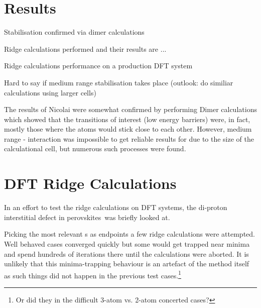 \section{Results}
\label{sec:perovskites-results}

\bit
\item Stabilisation confirmed via dimer calculations
\item Ridge calculations performed and their results are ...
\item Ridge calculations performance on a production DFT system
\item Hard to say if medium range stabilisation takes place (outlook: do similiar calculations using larger cells)
\eit






The results of Nicolai were somewhat confirmed by performing Dimer calculations which showed that the transitions of interest (low energy barriers) were, in fact, mostly those where the  atoms would stick close to each other.
However, medium range - interaction was impossible to get reliable results for due to the size of the calculational cell, but numerous such processes were found.

\section{DFT Ridge Calculations}
In an effort to test the ridge calculations on DFT systems, the di-proton interstitial defect in  perovskites~\citemiss was briefly looked at.

Picking the most relevant s as endpoints a few ridge calculations were attempted.
Well behaved cases converged quickly but some would get trapped near minima and spend hundreds of iterations there until the calculations were aborted.
It is unlikely that this minima-trapping behaviour is an artefact of the method itself as such things did not happen in the previous test cases.\footnote{Or did they in the difficult 3-atom vs. 2-atom concerted cases?}



